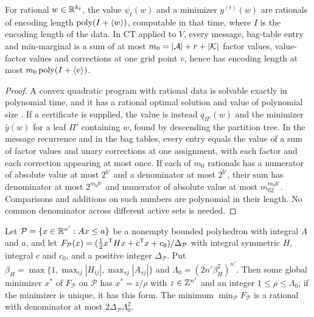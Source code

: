 \begin{lemma}\label{lem:cv-bits}
For rational $w\in\mathbb R^{k_t}$, the value $\psi_t(w)$ and a minimizer
$y^{(t)}(w)$ are rationals of encoding length $\operatorname{poly}(I+\langle w\rangle)$,
computable in that time, where $I$ is the encoding length of the data. In
CT applied to $V$, every message, bag-table entry and min-marginal is a sum
of at most $m_0=\lvert \mathcal A\rvert+r+\lvert \mathcal K\rvert$ factor values,
value-factor values and corrections at one grid point $v$, hence has
encoding length at most $m_0\operatorname{poly}(I+\langle v\rangle)$.
\end{lemma}

\begin{proof}
A convex quadratic program with rational data is solvable exactly in
polynomial time, and it has a rational optimal solution and value of
polynomial size \cite{KozlovTarasovKhachiyan1980}. If a certificate is
supplied, the value is instead $q_{\Pi'}(w)$ and the minimizer
$\bar y(w)$ for a leaf $\Pi'$ containing $w$, found by descending the
partition tree. In the message recurrence and in the bag tables, every entry
equals the value of a sum of factor values and unary corrections at one
assignment, with each factor and each correction appearing at most once. If
each of $m_0$ rationals has a numerator of absolute value at most $2^{b'}$
and a denominator at most $2^{b'}$, their sum has denominator at most
$2^{m_0b'}$ and numerator of absolute value at most $m_02^{m_0b'}$.
Comparisons and additions on such numbers are polynomial in their length. No
common denominator across different active sets is needed.
\end{proof}

\begin{lemma}\label{lem:cv-height}
Let $\mathcal P=\{x\in\mathbb R^{n'}:Ax\le a\}$ be a nonempty bounded polyhedron
with integral $A$ and $a$, and let
$F_{\mathcal P}(x)=(\frac12x^{\mathsf T}Hx+c^{\mathsf T}x+c_0)/\Delta_{\mathcal P}$ with
integral symmetric $H$, integral $c$ and $c_0$, and a positive integer
$\Delta_{\mathcal P}$. Put
$\beta_H=\max\{1,\max_{ij}|H_{ij}|,\max_{sj}|A_{sj}|\}$ and
$\Lambda_0=(2n'\beta_H^2)^{n'}$. Then some global minimizer $x^*$ of
$F_{\mathcal P}$ on $\mathcal P$ has $x^*=z/\rho$ with $z\in\mathbb Z^{n'}$ and an
integer $1\le\rho\le\Lambda_0$; if the minimizer is unique, it has this
form. The minimum $\min_{\mathcal P}F_{\mathcal P}$ is a rational with
denominator at most $2\Delta_{\mathcal P}\Lambda_0^2$.
\end{lemma}


